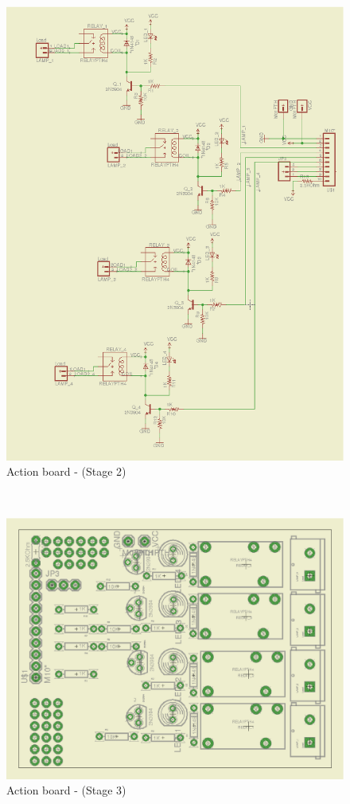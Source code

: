 \documentclass[12pt,a4paper]{report}
\begin{document}
\begin{figure}[H]
\centering
\includegraphics*[scale=0.25]{action_brd_s2}
\caption{Action board -  (Stage 2)}
\label{Action-brd-s2}
\end{figure}
\ \\
\begin{figure}[H]
\centering
\includegraphics*[scale=0.25]{action_brd_s3}
\caption{Action board -  (Stage 3)}
\label{Action-brd-s3}
\end{figure}
\ \\
%
%
\end{document}

